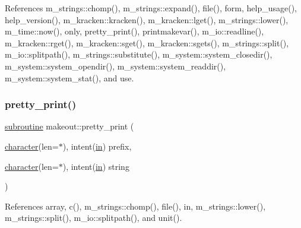 References m\+\_\+strings\+::chomp(), m\+\_\+strings\+::expand(), file(), form, help\+\_\+usage(), help\+\_\+version(), m\+\_\+kracken\+::kracken(), m\+\_\+kracken\+::lget(), m\+\_\+strings\+::lower(), m\+\_\+time\+::now(), only, pretty\+\_\+print(), printmakevar(), m\+\_\+io\+::readline(), m\+\_\+kracken\+::rget(), m\+\_\+kracken\+::sget(), m\+\_\+kracken\+::sgets(), m\+\_\+strings\+::split(), m\+\_\+io\+::splitpath(), m\+\_\+strings\+::substitute(), m\+\_\+system\+::system\+\_\+closedir(), m\+\_\+system\+::system\+\_\+opendir(), m\+\_\+system\+::system\+\_\+readdir(), m\+\_\+system\+::system\+\_\+stat(), and use.

\mbox{\label{makeout_8f90_a19d72934b25646092ee224d98550892a}} 
\subsubsection{\texorpdfstring{pretty\+\_\+print()}{pretty\_print()}}
{\footnotesize\ttfamily \hyperlink{M__stopwatch_83_8txt_acfbcff50169d691ff02d4a123ed70482}{subroutine} makeout\+::pretty\+\_\+print (\begin{DoxyParamCaption}\item[{\hyperlink{option__stopwatch_83_8txt_abd4b21fbbd175834027b5224bfe97e66}{character}(len=$\ast$), intent(\hyperlink{M__journal_83_8txt_afce72651d1eed785a2132bee863b2f38}{in})}]{prefix,  }\item[{\hyperlink{option__stopwatch_83_8txt_abd4b21fbbd175834027b5224bfe97e66}{character}(len=$\ast$), intent(\hyperlink{M__journal_83_8txt_afce72651d1eed785a2132bee863b2f38}{in})}]{string }\end{DoxyParamCaption})}



References array, c(), m\+\_\+strings\+::chomp(), file(), in, m\+\_\+strings\+::lower(), m\+\_\+strings\+::split(), m\+\_\+io\+::splitpath(), and unit().

\mbox{\label{makeout_8f90_a7a3ba6914f570677e23fd8754a666107}} 
